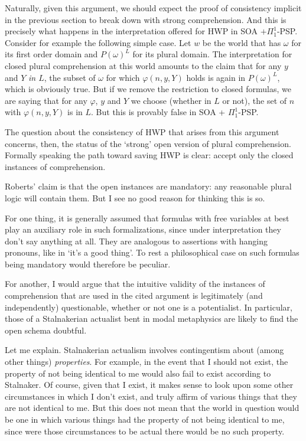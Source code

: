 \documentclass{article}
\begin{document}
Naturally, given this argument, we should expect the proof of consistency implicit in the 
previous section to break down with strong comprehension. And this is precisely 
what happens in the interpretation offered for HWP in SOA $+ \Pi_1^1$-PSP.
Consider for example the following simple case. Let $w$ be the world that has $\omega$
for its first order domain and $P(\omega)^L$ for its plural domain. 
The interpretation for closed plural comprehension at this world amounts to the claim 
that for any $y$ and $Y$ \emph{in $L$}, the subset of $\omega$ for which 
$\varphi(n, y, Y)$ holds is again in $P(\omega)^L$, which is obviously true. But 
if we remove the restriction to closed formulas, we are saying that for any $\varphi$, $y$ and $Y$ 
we choose (whether in $L$ or not), the set of $n$ with $\varphi(n, y, Y)$ is in $L$. 
But this is provably false in SOA + $\Pi_1^1$-PSP.

The question about the consistency of HWP that arises from this argument concerns, then,
the status of the `strong' open version of plural comprehension. Formally speaking 
the path toward saving HWP is clear: accept only the closed instances of comprehension.

Roberts' claim is that the open instances are mandatory:
any reasonable plural logic will contain them. But I see no good reason 
for thinking this is so. 

For one thing, it is generally assumed that formulas with free 
variables at best play an auxiliary role in such formalizations, since 
under interpretation they don't say anything at all. They are analogous to 
assertions with hanging pronouns, like in `it's a good thing'. To rest a philosophical 
case on such formulas being mandatory would therefore be peculiar.

For another, I would argue that the intuitive validity 
of the instances of comprehension that are used in 
the cited argument is legitimately (and independently) questionable, 
whether or not one is a potentialist. In particular, 
those of a Stalnakerian actualist bent in modal metaphysics 
are likely to find the open schema doubtful.

Let me explain. Stalnakerian actualism involves contingentism about 
(among other things) \emph{properties}. For example, 
in the event that I should not exist, the property of not being 
identical to me would also fail to exist according to Stalnaker. Of course, 
given that I exist, it makes sense to look upon some 
other circumstances in which I don't exist, and truly affirm 
of various things that they are not identical to me. 
But this does not mean that the world in question would 
be one in which various things had the property of not being 
identical to me, since were those circumstances to be actual 
there would be no such property. 
\end{document}
